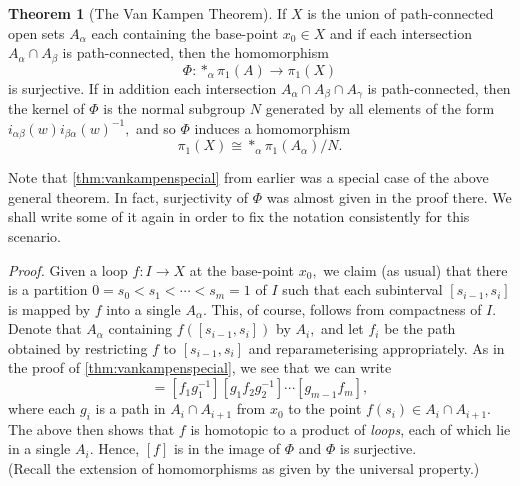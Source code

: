\documentclass[12pt]{article}
\theoremstyle{definition}
\newtheorem{thm}{Theorem}
\numberwithin{thm}{section}
\begin{document}
\begin{thm}[The Van Kampen Theorem] \label{thm:vankampen}
	If $X$ is the union of path-connected open sets $A_\alpha$ each containing the base-point $x_0 \in X$ and if each intersection $A_\alpha \cap A_\beta$ is path-connected, then the homomorphism
	\begin{equation*} 
		\Phi:*_\alpha\pi_1(A) \to \pi_1(X)
	\end{equation*}
	is surjective. If in addition each intersection $A_\alpha\cap A_\beta\cap A_\gamma$ is path-connected, then the kernel of $\Phi$ is the normal subgroup $N$ generated by all elements of the form $i_{\alpha\beta}(w)i_{\beta\alpha}(w)^{-1},$ and so $\Phi$ induces a homomorphism
	\begin{equation*} 
		\pi_1(X) \cong *_\alpha\pi_1(A_\alpha)/N.
	\end{equation*}
\end{thm}

Note that \cref{thm:vankampenspecial} from earlier was a special case of the above general theorem. In fact, surjectivity of $\Phi$ was almost given in the proof there. We shall write some of it again in order to fix the notation consistently for this scenario.

\emph{Proof.}
	Given a loop $f:I \to X$ at the base-point $x_0,$ we claim (as usual) that there is a partition $0 = s_0 < s_1 < \cdots < s_m = 1$ of $I$ such that each subinterval $[s_{i - 1}, s_i]$ is mapped by $f$ into a single $A_\alpha.$ This, of course, follows from compactness of $I.$\\
	Denote that $A_\alpha$ containing $f([s_{i - 1}, s_i])$ by $A_i,$ and let $f_i$ be the path obtained by restricting $f$ to $[s_{i-1}, s_i]$ and reparameterising appropriately. As in the proof of \cref{thm:vankampenspecial}, we see that we can write
	\begin{equation*} 
		[f] = [f_1g_1^{-1}][g_1f_2g_2^{-1}]\cdots[g_{m-1}f_m],
	\end{equation*}
	where each $g_i$ is a path in $A_i\cap A_{i+1}$ from $x_0$ to the point $f(s_i) \in A_i\cap A_{i+1}.$\\
	The above then shows that $f$ is homotopic to a product of \emph{loops}, each of which lie in a single $A_i.$ Hence, $[f]$ is in the image of $\Phi$ and $\Phi$ is surjective.\\
	(Recall the extension of homomorphisms as given by the universal property.)

	\dotfill
\end{document}
